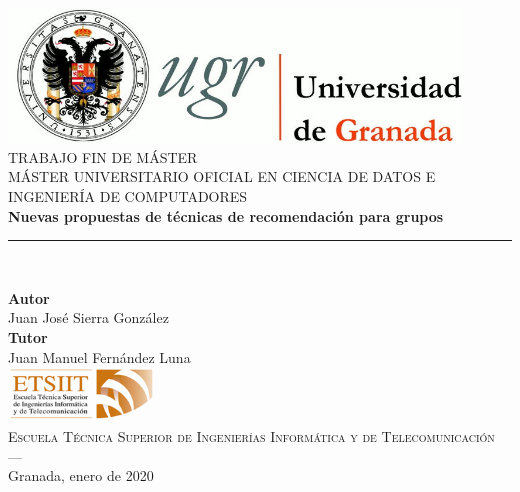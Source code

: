\begin{titlepage}
 
 
\newlength{\centeroffset}
\setlength{\centeroffset}{-0.5\oddsidemargin}
\addtolength{\centeroffset}{0.5\evensidemargin}
\thispagestyle{empty}

\noindent\hspace*{\centeroffset}\begin{minipage}{\textwidth}

\centering
\includegraphics[width=0.9\textwidth]{imagenes/logo_ugr.jpg}\\[1.4cm]

\textsc{ \Large TRABAJO FIN DE MÁSTER\\[0.2cm]}
\textsc{MÁSTER UNIVERSITARIO OFICIAL EN CIENCIA DE DATOS E INGENIERÍA DE COMPUTADORES}\\[1cm]
% 
{\Huge\bfseries Nuevas propuestas de técnicas de recomendación para grupos\\
}
\noindent\rule[-1ex]{\textwidth}{2pt}\\[3.5ex]
\end{minipage}

\vspace{2cm}
\noindent\hspace*{\centeroffset}\begin{minipage}{\textwidth}
\centering

\textbf{Autor}\\ {Juan José Sierra González}\\[2.5ex]
\textbf{Tutor}\\
{Juan Manuel Fernández Luna}\\[2cm]
\includegraphics[width=0.3\textwidth]{imagenes/etsiit_logo.png}\\[0.1cm]
\textsc{Escuela Técnica Superior de Ingenierías Informática y de Telecomunicación}\\
\textsc{---}\\
Granada, enero de 2020
\end{minipage}
\end{titlepage}


